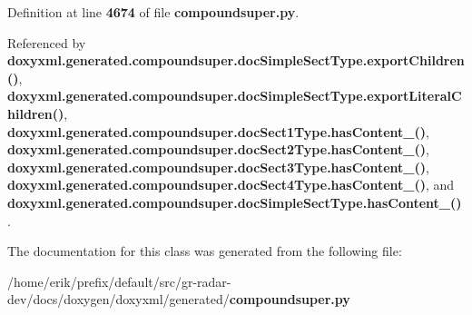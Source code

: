 Definition at line {\bf 4674} of file {\bf compoundsuper.\+py}.



Referenced by {\bf doxyxml.\+generated.\+compoundsuper.\+doc\+Simple\+Sect\+Type.\+export\+Children()}, {\bf doxyxml.\+generated.\+compoundsuper.\+doc\+Simple\+Sect\+Type.\+export\+Literal\+Children()}, {\bf doxyxml.\+generated.\+compoundsuper.\+doc\+Sect1\+Type.\+has\+Content\+\_\+()}, {\bf doxyxml.\+generated.\+compoundsuper.\+doc\+Sect2\+Type.\+has\+Content\+\_\+()}, {\bf doxyxml.\+generated.\+compoundsuper.\+doc\+Sect3\+Type.\+has\+Content\+\_\+()}, {\bf doxyxml.\+generated.\+compoundsuper.\+doc\+Sect4\+Type.\+has\+Content\+\_\+()}, and {\bf doxyxml.\+generated.\+compoundsuper.\+doc\+Simple\+Sect\+Type.\+has\+Content\+\_\+()}.



The documentation for this class was generated from the following file\+:\begin{DoxyCompactItemize}
\item 
/home/erik/prefix/default/src/gr-\/radar-\/dev/docs/doxygen/doxyxml/generated/{\bf compoundsuper.\+py}\end{DoxyCompactItemize}
